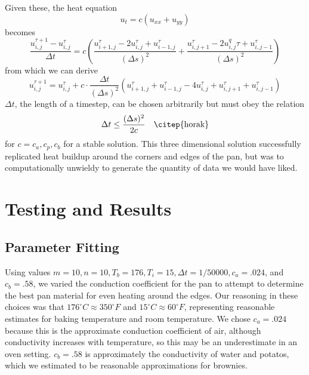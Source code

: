 \documentclass[12pt,draft]{reedmcm}
\begin{document}
Given these, the heat equation
\[u_t = c (u_{xx} + u_{yy})\]
becomes
\[\dfrac{u_{i,j}^{\tau+1} - u_{i,j}^\tau}{\Delta t} = c  \left(\dfrac{u_{i+1,j}^\tau - 2u_{i,j}^\tau + u_{i-1,j}^\tau}{(\Delta s)^2} + \dfrac{u_{i,j+1}^\tau - 2u_{i,j}^q\tau + u_{i,j-1}^\tau}{(\Delta s)^2}\right)\]
from which we can derive
\[u_{i,j}^{\tau+1} = u_{i,j}^\tau + c \cdot \frac{\Delta t}{(\Delta s)^2} \left(u_{i+1,j}^\tau + u_{i-1,j}^\tau - 4u_{i,j}^\tau + u_{i,j+1}^\tau + u_{i,j-1}^\tau \right)\]
$\Delta t$, the length of a timestep, can be chosen arbitrarily but must obey the relation
\[\Delta t \leq \frac{(\Delta s)^2}{2c} \quad \text{\citep{horak}}\]
for $c = c_a,c_p,c_b$ for a stable solution.  This three dimensional solution successfully replicated heat buildup around the corners and edges of the pan, but was to computationally unwieldy to generate the quantity of data we would have liked.\\



\section{Testing and Results}
\subsection{Parameter Fitting}
Using values $m = 10, n=10, T_b = 176, T_i = 15, \Delta t = 1/50000, c_a = .024$, and $c_b = .58$, we varied the conduction coefficient for the pan to attempt to determine the best pan material for even heating around the edges.  Our reasoning in these choices was that $176^\circ C \approx 350^\circ F$ and $15^\circ C \approx 60^\circ F$, representing reasonable estimates for baking temperature and room temperature.  We chose $c_a = .024$ because this is the approximate conduction coefficient of air, although conductivity increases with temperature, so this may be an underestimate in an oven setting.  $c_b = .58$ is approximately the conductivity of water and potatos, which we estimated to be reasonable approximations for brownies.\\
\end{document}

